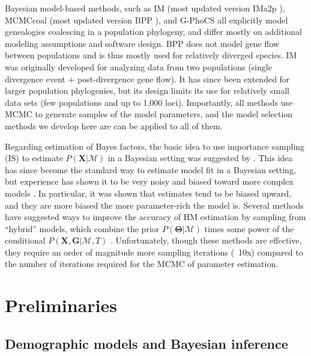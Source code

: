 \documentclass[11pt]{article}
\newcommand{\vect}[1]{\boldsymbol{\mathbf{#1}}}
\newcommand{\X}{\vect{X}}
\newcommand{\M}{\mathcal{M}}
\newcommand{\G}{\vect{G}}
\newcommand{\T}{\vect{\Theta}}
\newcommand{\1}{\mathbbm{1}}
\newcommand{\gp}{G-PhoCS }
\begin{document}
Bayesian model-based methods, such as IM \citep{NIELWAKE01} (most updated version IMa2p \citep{HEYNIEL07,SETHHEY16}), MCMCcoal \cite{RANNYANG03} (most updated version BPP \citep{YANG15}), and \gp \citep{GRONETAL11} all explicitly model genealogies coalescing in a population phylogeny, and differ mostly on additional modeling assumptions and software design.
%
BPP does not model gene flow between populations and is thus mostly used for relatively diverged species. 
%
IM was originally developed for analyzing data from two populations (single divergence event + post-divergence gene flow). 
%
It has since been extended for larger population phylogenies, but its design limits its use for relatively small data sets
(few populations and up to 1,000 loci). 
%
Importantly, all methods use MCMC to generate samples of the model parameters, and the model selection methods we develop here are can be applied to all of them.

Regarding estimation of Bayes factors, the basic idea to use importance sampling (IS) to estimate $P(\X|\M)$ in a Bayesian setting was suggested by \cite{NEWTRAFT94}. 
%
This idea has since become the standard way to estimate model fit in a Bayesian setting, but experience has shown it to be very noisy and biased toward more complex models \citep{XIEETAL11}.
%
In particular, it was shown that estimates tend to be biased upward, and they are more biased the more parameter-rich the model is. 
%
Several methods have suggested ways to improve the accuracy of HM estimation by sampling from ``hybrid'' models, which combine the prior $P(\T|\M)$ times some power of the conditional $P(\X,\G|\M,T)$ \citep{LARTPHIL06,XIEETAL11}.
%
Unfortunately, though these methods are effective, they require an order of magnitude more sampling iterations (~10x) compared to the number of iterations required for the MCMC of parameter estimation.


\section{Preliminaries}



\subsection{Demographic models and Bayesian inference}
\end{document}
